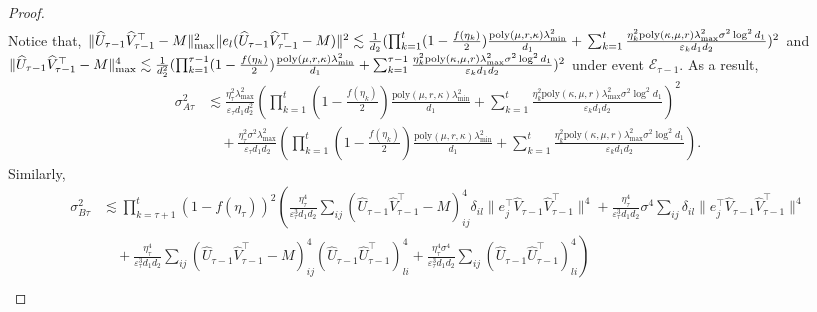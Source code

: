 \documentclass[12pt]{article}
\theoremstyle{plain}
\begin{document}
\begin{proof}
\begin{align*}
\end{align*}
Notice that, $\|\widehat{U}_{\tau-1}\widehat{V}_{\tau-1}^{\top} - M\|_{\max}^2\|e_l(\widehat{U}_{\tau-1}\widehat{V}_{\tau-1}^{\top}-M)\|^2\lesssim \frac{1}{d_2}(\prod_{k=1}^{t}(1-\frac{f(\eta_k)}{2}) \frac{\text{poly}(\mu,r,\kappa)\lambda_{\min}^2}{d_1} + \\ \sum_{k=1}^{t} \frac{\eta_k^2\text{poly}(\kappa,\mu,r)\lambda_{\max}^2\sigma^2\log^2d_1}{\varepsilon_k d_1d_2})^2$ and $\|\widehat{U}_{\tau-1}\widehat{V}_{\tau-1}^{\top} - M\|_{\max}^4\lesssim \frac{1}{d_2^2}(\prod_{k=1}^{\tau-1}(1-\frac{f(\eta_k)}{2}) \frac{\text{poly}(\mu,r,\kappa)\lambda_{\min}^2}{d_1} \\ + \sum_{k=1}^{\tau-1} \frac{\eta_k^2\text{poly}(\kappa,\mu,r)\lambda_{\max}^2\sigma^2\log^2d_1}{\varepsilon_k d_1d_2})^2$ under event $\mathcal{E}_{\tau-1}$. As a result,
\begin{align*}
    \sigma_{A\tau}^2&\lesssim \frac{\eta_{\tau}^2\lambda_{\max}^2}{\varepsilon_{\tau}d_1d_2^2}\left(\prod_{k=1}^{t}(1-\frac{f(\eta_k)}{2}) \frac{\text{poly}(\mu,r,\kappa)\lambda_{\min}^2}{d_1} +  \sum_{k=1}^{t} \frac{\eta_k^2\text{poly}(\kappa,\mu,r)\lambda_{\max}^2\sigma^2\log^2d_1}{\varepsilon_k d_1d_2}\right)^2 \\ &\quad + \frac{\eta_{\tau}^2\sigma^2\lambda_{\max}^2}{\varepsilon_{\tau}d_1d_2}\left(\prod_{k=1}^{t}(1-\frac{f(\eta_k)}{2}) \frac{\text{poly}(\mu,r,\kappa)\lambda_{\min}^2}{d_1} +  \sum_{k=1}^{t} \frac{\eta_k^2\text{poly}(\kappa,\mu,r)\lambda_{\max}^2\sigma^2\log^2d_1}{\varepsilon_k d_1d_2}\right).
\end{align*}
Similarly,
\begin{align*}
    \sigma_{B\tau}^2&\lesssim \prod_{k=\tau+1}^{t}(1-f(\eta_{\tau}))^2 \left(\frac{\eta_{\tau}^4}{\varepsilon_{\tau}^3 d_1d_2}\sum_{ij}(\widehat{U}_{\tau-1}\widehat{V}_{\tau-1}^{\top} - M)_{ij}^4\delta_{il}\|e_j^{\top}\widehat{V}_{\tau-1}\widehat{V}_{\tau-1}^{\top}\|^4 + \frac{\eta_{\tau}^4}{\varepsilon_{\tau}^3 d_1d_2}\sigma^4\sum_{ij} \delta_{il}\|e_j^{\top}\widehat{V}_{\tau-1}\widehat{V}_{\tau-1}^{\top}\|^4 \right.\\ &\left.\quad + \frac{\eta_{\tau}^4}{\varepsilon_{\tau}^3 d_1d_2}\sum_{ij} (\widehat{U}_{\tau-1}\widehat{V}_{\tau-1}^{\top} - M)_{ij}^4(\widehat{U}_{\tau-1}\widehat{U}_{\tau-1}^{\top})_{li}^4 + \frac{\eta_{\tau}^4\sigma^4}{\varepsilon_{\tau}^3 d_1d_2}\sum_{ij} (\widehat{U}_{\tau-1}\widehat{U}_{\tau-1}^{\top})_{li}^4\right) \\

\end{align*}
\end{proof}
\end{document}
